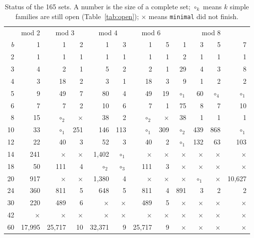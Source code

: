 \documentclass[11pt]{article}
\newcommand{\code}[1]{\texttt{#1}}
\begin{document}
\begin{table}[h]
\centering\small
\setlength{\tabcolsep}{4.5pt}
\begin{tabular}{@{}r|r|rr|rr|rr|rrrr@{}}
\toprule
 & \multicolumn{1}{c|}{mod 2} & \multicolumn{2}{c|}{mod 3} & \multicolumn{2}{c|}{mod 4} & \multicolumn{2}{c|}{mod 6} & \multicolumn{4}{c}{mod 8}\\
$b$ & 1 & 1 & 2 & 1 & 3 & 1 & 5 & 1 & 3 & 5 & 7\\
\midrule
2 & 1 & 1 & 1 & 1 & 1 & 1 & 1 & 2 & 1 & 1 & 1 \\
3 & 4 & 2 & 1 & 5 & 2 & 2 & 1 & 29 & 4 & 3 & 8 \\
4 & 3 & 18 & 2 & 3 & 1 & 18 & 3 & 9 & 1 & 2 & 2 \\
5 & 9 & 49 & 7 & 80 & 4 & 49 & 19 & $\circ_{1}$ & 60 & $\circ_{4}$ & $\circ_{1}$ \\
6 & 7 & 7 & 2 & 10 & 6 & 7 & 1 & 75 & 8 & 7 & 10 \\
8 & 15 & $\circ_{2}$ & $\times$ & 38 & 2 & $\circ_{2}$ & $\times$ & 38 & 1 & 1 & 1 \\
10 & 33 & $\circ_{1}$ & 251 & 146 & 113 & $\circ_{1}$ & 309 & $\circ_{2}$ & 439 & 868 & $\circ_{1}$ \\
12 & 22 & 40 & 3 & 52 & 3 & 40 & 2 & $\circ_{1}$ & 132 & 63 & 103 \\
14 & 241 & $\times$ & $\times$ & 1{,}402 & $\circ_{1}$ & $\times$ & $\times$ & $\times$ & $\times$ & $\times$ & $\times$ \\
18 & 50 & 111 & 4 & $\circ_{2}$ & $\circ_{3}$ & 111 & 3 & $\times$ & $\times$ & $\times$ & $\times$ \\
20 & 917 & $\times$ & $\times$ & 1{,}380 & 4 & $\times$ & $\times$ & $\times$ & $\circ_{1}$ & $\times$ & 10{,}627 \\
24 & 360 & 811 & 5 & 648 & 5 & 811 & 4 & 891 & 3 & 2 & 2 \\
30 & 220 & 489 & 6 & $\times$ & $\times$ & 489 & 5 & $\times$ & $\times$ & $\times$ & $\times$ \\
42 & $\times$ & $\times$ & $\times$ & $\times$ & $\times$ & $\times$ & $\times$ & $\times$ & $\times$ & $\times$ & $\times$ \\
60 & 17{,}995 & 25{,}717 & 10 & 32{,}371 & 9 & 25{,}717 & 9 & $\times$ & $\times$ & $\times$ & $\times$ \\
\bottomrule
\end{tabular}
\caption{Status of the 165 sets. A number is the size of a complete set; $\circ_k$ means $k$ simple families are still open (Table~\ref{tab:open}); $\times$ means \code{minimal} did not finish.}
\end{table}
\end{document}

